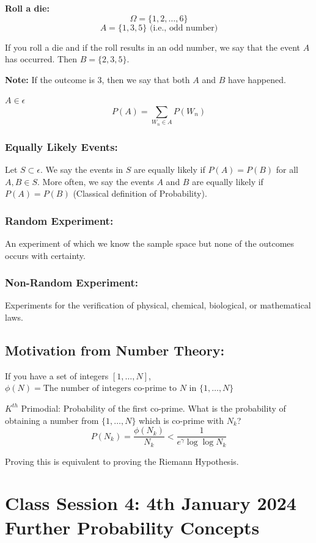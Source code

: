 \documentclass{article}
\theoremstyle{definition}
\begin{document}
\textbf{Roll a die:}
\[ \Omega = \{1, 2, \dots , 6\} \]
\[ A = \{1,3,5\} \text{ (i.e., odd number)} \]

If you roll a die and if the roll results in an odd number, we say that the event $A$ has occurred.
Then $B = \{2,3,5\}$.
\begin{mdframed}
    \textbf{Note:} If the outcome is 3, then we say that both $A$ and $B$ have happened.
\end{mdframed}

$A \in \epsilon$
\[ P(A) = \sum_{W_n \in A} P(W_n) \]

\subsubsection{Equally Likely Events:} 
Let $S \subset \epsilon$. We say the events in $S$ are equally likely if $P(A) = P(B)$
    for all $A, B \in S$. More often, we say the events $A$ and $B$ are equally likely if $P(A) = P(B)$ (Classical definition of Probability).
\subsubsection{Random Experiment:} 
An experiment of which we know the sample space but none of the outcomes occurs with certainty.
  \subsubsection{Non-Random Experiment:} 
  Experiments for the verification of physical, chemical, biological, or mathematical laws.


\subsection{Motivation from Number Theory:}
If you have a set of integers $[1, \dots, N]$,
$\phi (N) = \text{The number of integers co-prime to } N \text{ in } \{1, \dots, N\} $

$K^{th}$ Primodial: Probability of the first co-prime.
What is the probability of obtaining a number from $\{1, \dots, N\}$ which is co-prime with $N_k$?
\[ P(N_k) = \frac{\phi (N_k)}{N_k} < \frac{1}{e^\gamma \log \log N_k} \]

Proving this is equivalent to proving the Riemann Hypothesis.

\section{Class Session 4: 4th January 2024 \\ Further Probability Concepts}
\end{document}
